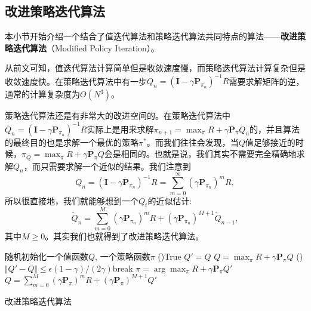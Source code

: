 \subsection{改进策略迭代算法}

本小节开始介绍一个结合了值迭代算法和策略迭代算法共同特点的算法——\textbf{改进策略迭代算法}（Modified Policy Iteration）。 

从前文可知，值迭代算法计算简单但是收敛速度慢，而策略迭代算法计算复杂但是收敛速度快。在策略迭代算法中有一步$Q_n = (\mathbf{I} - \gamma\mathbf{P}_{\pi_n})^{-1} R$需要求解矩阵的逆，通常的计算复杂度为$O(N^3)$。

策略迭代算法还是有非常大的改进空间的。在策略迭代算法中$Q_n = (\mathbf{I} - \gamma \mathbf{P}_{\pi_n})^{-1} R$实际上是用来求解$\pi_{n+1} = \max_{\pi} R + \gamma \mathbf{P}_{\pi} Q_n$的，并且算法的最终目的也是求解一个最优的策略$\pi^*$。而我们往往会发现，当$Q$值足够接近的时候，$\pi_Q = \max_{\pi} R + \gamma \mathbf{P}_{\pi}Q$会是相同的。也就是说，我们其实不需要完全精确地求解$Q_n$，而只需要求解一个近似的结果。我们注意到
\begin{equation}
    Q_n = (\mathbf{I} - \gamma \mathbf{P}_{\pi_n})^{-1} R
    = \sum^\infty_{m=0} (\gamma \mathbf{P}_{\pi_n})^m R,
\end{equation}
所以很直接地，我们就能够想到一个$Q_t$的近似估计:
\begin{equation}
    \tilde Q_n = \sum^{M}_{m=0}(\gamma\mathbf{P}_{\pi_n})^m R 
    + (\gamma\mathbf{P}_{\pi_n})^{M+1} \tilde Q_{n-1},
\end{equation}
其中$M \ge 0$。其实我们也就得到了改进策略迭代算法。

\begin{algorithm}[htbp]
    \LinesNumbered
    随机初始化一个值函数$Q$, 一个策略函数$\pi$\;
    \While(){True}{
        $Q' = Q$\;
        $Q = \max_{\pi} R + \gamma \mathbf{P}_{\pi} Q$\;
        \If(){$\Vert Q' - Q \Vert \le \epsilon(1 - \gamma)/(2\gamma)$}{break\;}
        $\pi = \arg\max_{\pi} R + \gamma\mathbf{P}_{\pi} Q'$\;
        $Q = \sum^{M}_{m=0}(\gamma \mathbf{P}_{\pi})^mR 
        + (\gamma \mathbf{P}_{\pi})^{M+1} Q'$\;
    }
    \caption{改进策略迭代算法}
\end{algorithm}

